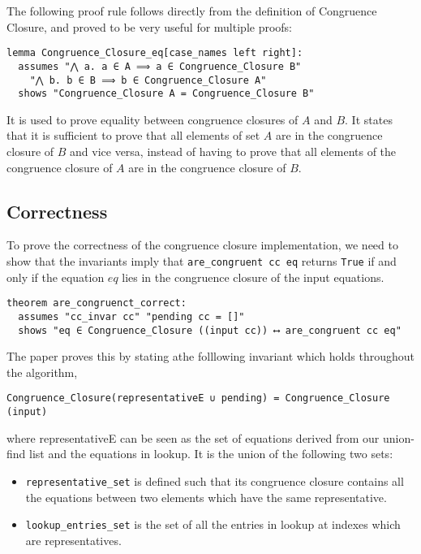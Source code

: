 The following proof rule follows directly from the definition of Congruence Closure, and proved to be very useful for multiple proofs:

\begin{lstlisting}
lemma Congruence_Closure_eq[case_names left right]:
  assumes "⋀ a. a ∈ A ⟹ a ∈ Congruence_Closure B"
    "⋀ b. b ∈ B ⟹ b ∈ Congruence_Closure A"
  shows "Congruence_Closure A = Congruence_Closure B"
\end{lstlisting}

It is used to prove equality between congruence closures of $A$ and $B$. It states that it is sufficient to prove that all elements of set $A$ are in the congruence closure of $B$ and vice versa, instead of having to prove that all elements of the congruence closure of $A$ are in the congruence closure of $B$.


\subsection{Correctness}

To prove the correctness of the congruence closure implementation, we need to show that the invariants imply that \lstinline{are_congruent cc eq} returns \lstinline{True} if and only if the equation $eq$ lies in the congruence closure of the input equations.

\begin{lstlisting}
theorem are_congruenct_correct:
  assumes "cc_invar cc" "pending cc = []"
  shows "eq ∈ Congruence_Closure ((input cc)) ⟷ are_congruent cc eq"
\end{lstlisting}

The paper \cite{Nieuwenhuis} proves this by stating athe folllowing invariant which holds throughout the algorithm,

\begin{lstlisting}
Congruence_Closure(representativeE ∪ pending) = Congruence_Closure (input)
\end{lstlisting}

where representativeE can be seen as the set of equations derived from our union-find list and the equations in lookup. It is the union of the following two sets:

\begin{itemize}
    \item\lstinline{representative_set} is defined such that its congruence closure contains all the equations between two elements which have the same representative.
    \item\lstinline{lookup_entries_set} is the set of all the entries in lookup at indexes which are representatives.
\end{itemize}

